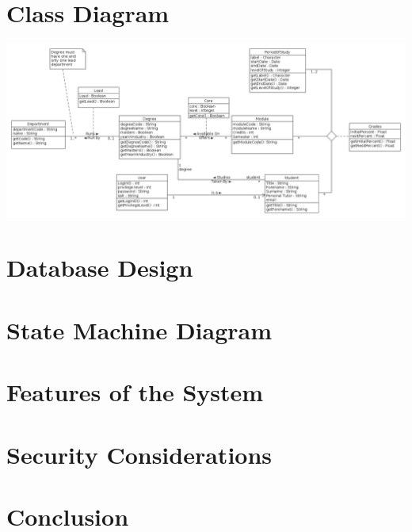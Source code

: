 \documentclass[12pt,a4paper]{article}
\begin{document}
\section{Class Diagram}

\centerline{\includegraphics[width=20cm]{classDiagram1}}


\section{Database Design}

\section{State Machine Diagram}

\section{Features of the System}

\section{Security Considerations}

\section{Conclusion}
\end{document}

